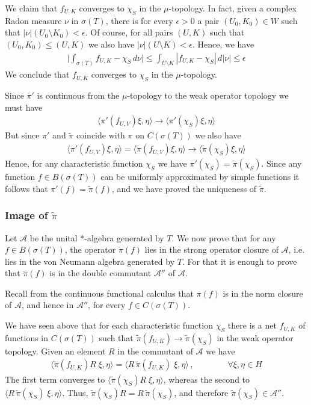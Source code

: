 \documentclass[12pt]{article}
\begin{document}
We claim that $f_{U, K}$ converges to $\chi_S$ in the $\mu$-topology. In fact, given a complex Radon measure $\nu$ in $\sigma(T)$, there is for every $\epsilon > 0$ a pair $(U_0, K_0) \in W$ such that $|\nu|(U_0 \setminus K_0) < \epsilon$. Of course, for all pairs $(U, K)$ such that $(U_0, K_0) \leq (U, K)$ we also have $|\nu|(U \setminus K) < \epsilon$. Hence, we have
\begin{align*}
\big| \int_{\sigma(T)} f_{U, K} - \chi_S \,d\nu \big| \leq \int_{U \setminus K} |f_{U, K} - \chi_S| \,d|\nu| \leq \epsilon
\end{align*}
We conclude that $f_{U,K}$ converges to $\chi_S$ in the $\mu$-topology.

Since $\pi'$ is continuous from the $\mu$-topology to the weak operator topology we must have
\begin{align*}
\langle \pi'(f_{U,V})\xi, \eta \rangle \longrightarrow \langle \pi'(\chi_S) \xi, \eta \rangle
\end{align*}
But since $\pi'$ and $\widetilde{\pi}$ coincide with $\pi$ on $C(\sigma(T))$ we also have
\begin{align*}
\langle \pi'(f_{U,V})\xi, \eta \rangle = \langle \widetilde{\pi}(f_{U,V})\xi, \eta \rangle  \longrightarrow \langle \widetilde{\pi}(\chi_S) \xi, \eta \rangle
\end{align*}
Hence, for any characteristic function $\chi_S$ we have $\pi'(\chi_S) = \widetilde{\pi}(\chi_S)$. Since any function $f \in B(\sigma(T))$ can be uniformly approximated by simple functions it follows that $\pi'(f) = \widetilde{\pi}(f)$, and we have proved the uniqueness of $\widetilde{\pi}$.

\subsubsection{Image of $\widetilde{\pi}$}
Let $\mathcal{A}$ be the unital *-algebra generated by $T$. We now prove that for any $f \in B(\sigma(T))$, the operator $\widetilde{\pi}(f)$ lies in the strong operator closure of $\mathcal{A}$, i.e. lies in the von Neumann algebra generated by $T$. For that it is enough to prove that $\widetilde{\pi}(f)$ is in the double commutant $\mathcal{A}''$ of $\mathcal{A}$.

Recall from the continuous functional calculus that $\pi(f)$ is in the norm closure of $\mathcal{A}$, and hence in $\mathcal{A}''$, for every $f \in C(\sigma(T))$.

We have seen above that for each characteristic function $\chi_S$ there is a net $f_{U, K}$ of functions in $C(\sigma(T))$ such that $\widetilde{\pi}(f_{U,K}) \to \widetilde{\pi}(\chi_S)$ in the weak operator topology. Given an element $R$ in the commutant of $\mathcal{A}$ we have
\begin{align*}
\langle \widetilde{\pi}(f_{U,K}) R\; \xi, \eta \rangle = \langle R\, \widetilde{\pi}(f_{U,K})\; \xi, \eta \rangle\,, \qquad\qquad \forall \xi, \eta \in H
\end{align*}
The first term converges to $\langle \widetilde{\pi}(\chi_S) R\; \xi, \eta \rangle$, whereas the second to $\langle R\,\widetilde{\pi}(\chi_S)\; \xi, \eta \rangle$. Thus, $\widetilde{\pi}(\chi_S) R = R\,\widetilde{\pi}(\chi_S)$, and therefore $\widetilde{\pi}(\chi_S) \in \mathcal{A}''$.
\end{document}
